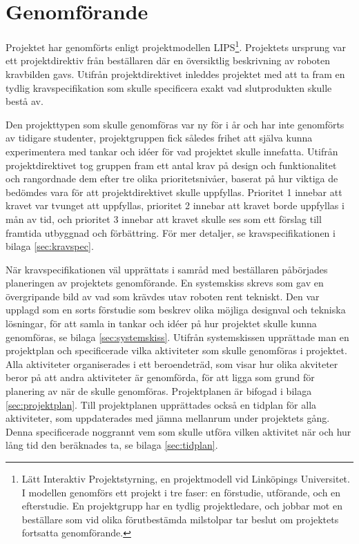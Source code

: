 

\section{Genomförande}

Projektet har genomförts enligt projektmodellen LIPS\footnote{Lätt Interaktiv Projektstyrning, en projektmodell vid Linköpings Universitet. I modellen genomförs ett projekt i tre faser: en förstudie, utförande, och en efterstudie. En projektgrupp har en tydlig projektledare, och jobbar mot en beställare som vid olika förutbestämda milstolpar tar beslut om projektets fortsatta genomförande.}. Projektets ursprung var ett projektdirektiv från beställaren där en översiktlig beskrivning av roboten  kravbilden gavs. Utifrån projektdirektivet inleddes projektet med att ta fram en tydlig kravspecifikation som skulle specificera exakt vad slutprodukten skulle bestå av.

Den projekttypen som skulle genomföras var ny för i år och har inte genomförts av tidigare studenter, projektgruppen fick således frihet att själva kunna experimentera med tankar och idéer för vad projektet skulle innefatta. Utifrån projektdirektivet tog gruppen fram ett antal krav på design och funktionalitet och rangordnade dem efter tre olika prioritetsnivåer, baserat på hur viktiga de bedömdes vara för att projektdirektivet skulle uppfyllas. Prioritet 1 innebar att kravet var tvunget att uppfyllas, prioritet 2 innebar att kravet borde uppfyllas i mån av tid, och prioritet 3 innebar att kravet skulle ses som ett förslag till framtida utbyggnad och förbättring. För mer detaljer, se kravspecifikationen i bilaga \ref{sec:kravspec}.

När kravspecifikationen väl upprättats i samråd med beställaren påbörjades planeringen av projektets genomförande. En systemskiss skrevs som gav en övergripande bild av vad som krävdes utav roboten rent tekniskt. Den var upplagd som en sorts förstudie som beskrev olika möjliga designval och tekniska lösningar, för att samla in tankar och idéer på hur projektet skulle kunna genomföras, se bilaga \ref{sec:systemskiss}. Utifrån systemskissen upprättade man en projektplan och specificerade vilka aktiviteter som skulle genomföras i projektet. Alla aktiviteter organiserades i ett beroendeträd, som visar hur olika akviteter beror på att andra aktiviteter är genomförda, för att ligga som grund för planering av när de skulle genomföras. Projektplanen är bifogad i bilaga \ref{sec:projektplan}. Till projektplanen upprättades också en tidplan för alla aktiviteter, som uppdaterades med jämna mellanrum under projektets gång. Denna specificerade noggrannt vem som skulle utföra vilken aktivitet när och hur lång tid den beräknades ta, se bilaga \ref{sec:tidplan}.

